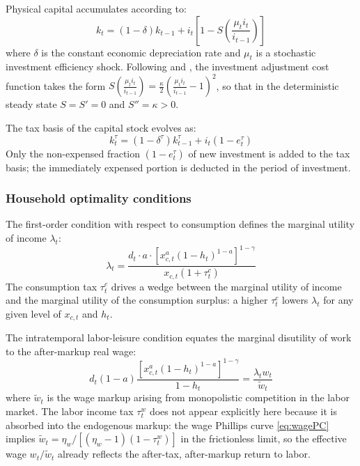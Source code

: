 \documentclass[article,11pt,letterpaper,fleqn]{article}
\theoremstyle{definition}
\numberwithin{equation}{section}
\begin{document}
Physical capital accumulates according to:
\begin{equation}\label{eq:kacc}
k_{t} = (1-\delta)k_{t-1} + i_{t}\left[1-S\!\left(\frac{\mu_t i_{t}}{i_{t-1}}\right)\right]
\end{equation}
where $\delta$ is the constant economic depreciation rate and $\mu_t$ is a stochastic investment efficiency shock. Following \citet{SW2003} and \citet{Zubairy2014}, the investment adjustment cost function takes the form $S\!\left(\frac{\mu_t i_t}{i_{t-1}}\right) = \frac{\kappa}{2}\!\left(\frac{\mu_t i_t}{i_{t-1}}-1\right)^2$, so that in the deterministic steady state $S = S' = 0$ and $S'' = \kappa > 0$.

The tax basis of the capital stock evolves as:
\begin{equation}\label{eq:ktau}
k_{t}^{\tau} = (1-\delta^{\tau})k_{t-1}^{\tau} + i_{t}(1-e_{t}^{\tau})
\end{equation}
Only the non-expensed fraction $(1-e_t^{\tau})$ of new investment is added to the tax basis; the immediately expensed portion is deducted in the period of investment.

\subsubsection*{Household optimality conditions}

The first-order condition with respect to consumption defines the marginal utility of income $\lambda_t$:
\begin{equation}\label{eq:lambda}
\lambda_t = \frac{d_t \cdot a \cdot \left[x_{c,t}^{a}(1-h_t)^{1-a}\right]^{1-\gamma}}{x_{c,t}(1+\tau_{t}^{c})}
\end{equation}
The consumption tax $\tau_t^c$ drives a wedge between the marginal utility of income and the marginal utility of the consumption surplus: a higher $\tau_t^c$ lowers $\lambda_t$ for any given level of $x_{c,t}$ and $h_t$.

The intratemporal labor-leisure condition equates the marginal disutility of work to the after-markup real wage:
\begin{equation}\label{eq:labor}
d_t (1-a) \frac{\left[x_{c,t}^{a}(1-h_t)^{1-a}\right]^{1-\gamma}}{1-h_t} = \frac{\lambda_t w_t}{\tilde{w}_t}
\end{equation}
where $\tilde{w}_t$ is the wage markup arising from monopolistic competition in the labor market. The labor income tax $\tau_t^w$ does not appear explicitly here because it is absorbed into the endogenous markup: the wage Phillips curve \eqref{eq:wagePC} implies $\tilde{w}_t = \eta_w/[(\eta_w-1)(1-\tau_t^w)]$ in the frictionless limit, so the effective wage $w_t/\tilde{w}_t$ already reflects the after-tax, after-markup return to labor.
\end{document}
